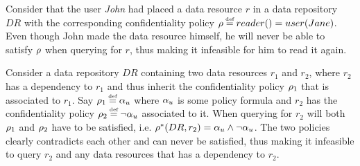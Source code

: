 \begin{example}
Consider that the user \emph{John} had placed a data resource $r$ in a data repository $DR$ with the corresponding confidentiality policy $\conf \eqdef reader() = user(Jane)$. Even though John made the data resource himself, he will never be able to satisfy $\rho$ when querying for $r$, thus making it infeasible for him to read it again.
\end{example}

\begin{example}
Consider a data repository $DR$ containing two data resources $r_1$ and $r_2$, where $r_2$ has a dependency to $r_1$ and thus inherit the confidentiality policy $\rho_1$ that is associated to $r_1$. Say $\conf_1 \eqdef \upf$ where $\alpha_u$ is some policy formula and $r_2$ has the confidentiality policy $\conf_2 \eqdef \lnot \upf$ associated to it. When querying for $r_2$ will both $\rho_1$ and $\rho_2$ have to be satisfied, i.e. $\rho^{\ast}(DR,r_2) = \alpha_u \land \lnot \alpha_u$. The two policies clearly contradicts each other and can never be satisfied, thus making it infeasible to query $r_2$ and any data resources that has a dependency to $r_2$.
\end{example}

